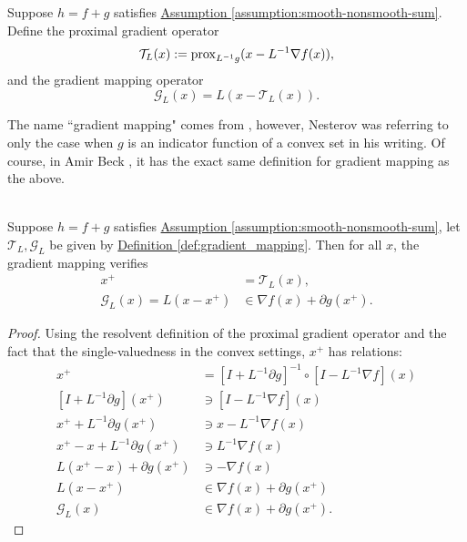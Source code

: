 \documentclass[12pt]{article}
\begin{document}
    \begin{definition}
        \label{def:gradient_mapping}
        Suppose $h = f + g$ satisfies 
        \hyperref[assumption:smooth-nonsmooth-sum]{Assumption \ref*{assumption:smooth-nonsmooth-sum}}. 
        Define the proximal gradient operator
        $$
            \mathcal T_L(x) := \operatorname{prox}_{L^{-1}g}(x - L^{-1}\nabla f(x)),
        $$
        and the gradient mapping operator
        $$
            \mathcal G_L(x) = L(x - \mathcal T_L(x)). 
        $$
    \end{definition}
    \begin{remark}
        The name ``gradient mapping" comes from \cite[(2.2.54)]{nesterov_lectures_2018}, however, Nesterov was referring to only the case when $g$ is an indicator function of a convex set in his writing. 
        Of course, in Amir Beck \cite[10.3.2]{beck_first-order_nodate}, it has the exact same definition for gradient mapping as the above. 
    \end{remark}

    \begin{lemma}
    \label{lemma:grad-map-approx-subgrad}\; \\
        Suppose $h = f + g$ satisfies 
        \hyperref[assumption:smooth-nonsmooth-sum]{Assumption \ref{assumption:smooth-nonsmooth-sum}}, 
        let $\mathcal T_L, \mathcal G_L$ be given by 
        \hyperref[def:gradient_mapping]{Definition \ref*{def:gradient_mapping}}.
        Then for all $x$, the gradient mapping verifies
        \begin{align*}
            x^+ &= \mathcal T_L(x), 
            \\
            \mathcal G_L(x) = L(x - x^+) &\in  \nabla f(x) + \partial g(x^+). 
        \end{align*}
    \end{lemma}
    \begin{proof}
        Using the resolvent definition of the proximal gradient operator and the fact that the single-valuedness in the convex settings, $x^+$ has relations: 
        \begin{align*}
            x^+ &= [I + L^{-1}\partial g]^{-1}\circ [I - L^{-1}\nabla f](x)
            \\
            [I + L^{-1}\partial g](x^+) &\ni [I - L^{-1}\nabla f](x)
            \\
            x^+ + L^{-1}\partial g(x^+) &\ni x - L^{-1}\nabla f(x)
            \\
            x^+ - x + L^{-1}\partial g(x^+) &\ni L^{-1}\nabla f(x)
            \\
            L(x^+ - x) + \partial g(x^+) &\ni - \nabla f(x)
            \\
            L(x - x^+) &\in \nabla f(x) + \partial g(x^+)
            \\
            \mathcal G_L(x) &\in \nabla f(x) + \partial g(x^+). 
        \end{align*}
    \end{proof}
\end{document}
